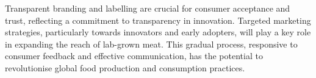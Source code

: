 \documentclass[10pt]{article}
\begin{document}
\begin{sloppypar}
  Transparent branding and labelling are crucial for consumer acceptance and trust, reflecting a commitment to transparency in innovation. Targeted marketing strategies, particularly towards innovators and early adopters, will play a key role in expanding the reach of lab-grown meat. This gradual process, responsive to consumer feedback and effective communication, has the potential to revolutionise global food production and consumption practices.

  \pagebreak
  \singlespacing %
  
  

\end{sloppypar}
\end{document}
